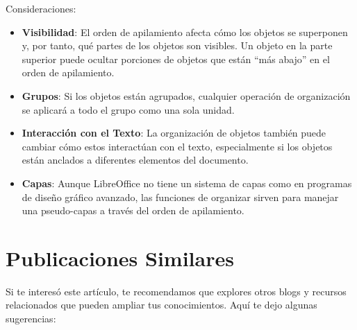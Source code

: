 \documentclass[
  jou,
  floatsintext,
  longtable,
  a4paper,
  nolmodern,
  notxfonts,
  notimes,
  colorlinks=true,linkcolor=blue,citecolor=blue,urlcolor=blue]{apa7}
\begin{document}
Consideraciones:

\begin{itemize}
\item
  \textbf{Visibilidad}: El orden de apilamiento afecta cómo los objetos
  se superponen y, por tanto, qué partes de los objetos son visibles. Un
  objeto en la parte superior puede ocultar porciones de objetos que
  están ``más abajo'' en el orden de apilamiento.
\item
  \textbf{Grupos}: Si los objetos están agrupados, cualquier operación
  de organización se aplicará a todo el grupo como una sola unidad.
\item
  \textbf{Interacción con el Texto}: La organización de objetos también
  puede cambiar cómo estos interactúan con el texto, especialmente si
  los objetos están anclados a diferentes elementos del documento.
\item
  \textbf{Capas}: Aunque LibreOffice no tiene un sistema de capas como
  en programas de diseño gráfico avanzado, las funciones de organizar
  sirven para manejar una pseudo-capas a través del orden de
  apilamiento.
\end{itemize}

\section{Publicaciones Similares}\label{publicaciones-similares}

Si te interesó este artículo, te recomendamos que explores otros blogs y
recursos relacionados que pueden ampliar tus conocimientos. Aquí te dejo
algunas sugerencias:
\end{document}
